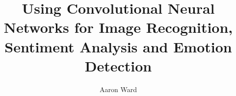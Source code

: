 \documentclass[12pt,ITBthesis]{report}
\begin{document}
\makeatletter
\renewcommand\listoffigures{%
        \@starttoc{lot}%
}
\makeatother

\makeatletter
\renewcommand\listoftables{%
        \@starttoc{lot}%
}
\makeatother

\makeatletter
\renewcommand\appendix{%
 \par
 \setcounter{chapter}{0}%
 \setcounter{section}{0}%
 \setcounter{subsection}{0}%
 \gdef\thesection{\@Alph\c@section}
 \gdef\@sect##1##2##3##4##5##6[##7]##8{%
  \refstepcounter{##1}%
  \protected@edef\@svsec{\@seccntformat{##1}\relax}%
  \begingroup
    \hspace{-\parindent}##6\appendixname~ {%
    \@hangfrom{\hskip ##3 \relax\@svsec}\par%
    \hspace{-\parindent}\interlinepenalty \@M ##8 \@@par}%
  \endgroup
  \csname ##1mark\endcsname{##7}%
  \addcontentsline{toc}{##1}{\protect\numberline{\csname the##1\endcsname}##7}%
  \@xsect{##5}%
 }%
}%
\makeatother

\setlength{\parskip}{1ex plus 0.5ex minus 0.2ex}


\title{Using Convolutional Neural Networks for Image Recognition, Sentiment Analysis and Emotion Detection}

\author{Aaron Ward}



\address{Dublin, Ireland }






%

\setcounter{page}{1} \beforepreface



{ 
}

%



\afterpreface
\def\baselinestretch{1}
\end{document}
